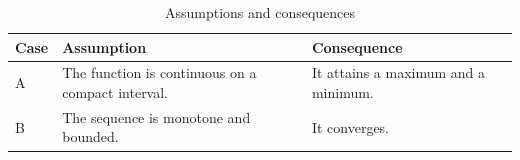 \documentclass{article}
\begin{document}
\begin{table}[ht]
\centering
\caption{Assumptions and consequences}
\begin{tabularx}{\linewidth}{@{}lYY@{}}
\toprule
Case & Assumption & Consequence \\
\midrule
A & The function is continuous on a compact interval. & It attains a maximum and a minimum. \\
B & The sequence is monotone and bounded. & It converges. \\
\bottomrule
\end{tabularx}
\end{table}
\end{document}
